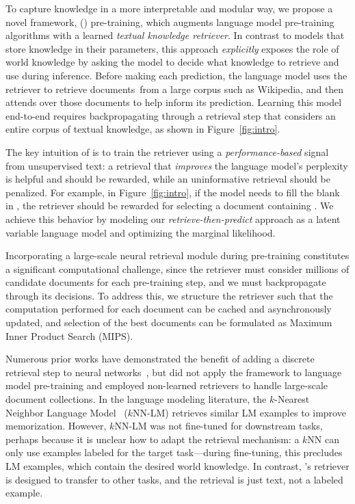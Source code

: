\documentclass{article}
\begin{document}
To capture knowledge in a more interpretable and modular way, we propose a novel framework, \thefullname (\thename) pre-training, which augments language model pre-training algorithms with a learned {\em textual knowledge retriever}.
In contrast to models that store knowledge in their parameters, this approach \emph{explicitly} exposes the role of world knowledge by asking the model to decide what knowledge to retrieve and use during inference.
Before making each prediction, the language model uses the retriever to retrieve documents\footnotemark~from a large corpus such as Wikipedia,
and then attends over those documents to help inform its prediction.
Learning this model end-to-end requires backpropagating through a retrieval step that considers an entire corpus of textual knowledge, as shown in Figure~\ref{fig:intro}.

The key intuition of \thename is to
train the retriever using a {\em performance-based} signal from unsupervised text:
a retrieval that {\em improves} the language model's perplexity is helpful and should be rewarded, while an uninformative retrieval should be penalized. 
For example, in Figure~\ref{fig:intro}, if the model needs to fill the blank in , the retriever should be rewarded for selecting a document containing . We achieve this behavior by modeling our {\em retrieve-then-predict} approach as a latent variable language model and optimizing the marginal likelihood.

Incorporating a large-scale neural retrieval module
during pre-training constitutes a significant computational challenge, since the retriever must consider millions of candidate documents for each pre-training step, and we must backpropagate through its decisions. To address this, we structure the retriever such that the computation performed for each document can be cached and asynchronously updated, and selection of the best documents can be formulated as Maximum Inner Product Search (MIPS).

Numerous prior works have
demonstrated the benefit of adding a discrete retrieval step to neural networks~\cite{key_value_memorynetwork, drqa}, but did not apply the framework
to language model pre-training and employed non-learned retrievers to handle large-scale document collections.
In the language modeling literature, the $k$-Nearest Neighbor Language Model~\cite{knnlm} ($k$NN-LM) retrieves similar LM examples to improve memorization. However, $k$NN-LM was not fine-tuned for downstream tasks, perhaps because it is unclear how to adapt the retrieval mechanism: a $k$NN can only use examples labeled for the target task---during fine-tuning, this precludes LM examples, which contain the desired world knowledge. In contrast, \thename's retriever is designed to transfer to other tasks, and the retrieval is just text, not a labeled example.
\end{document}
